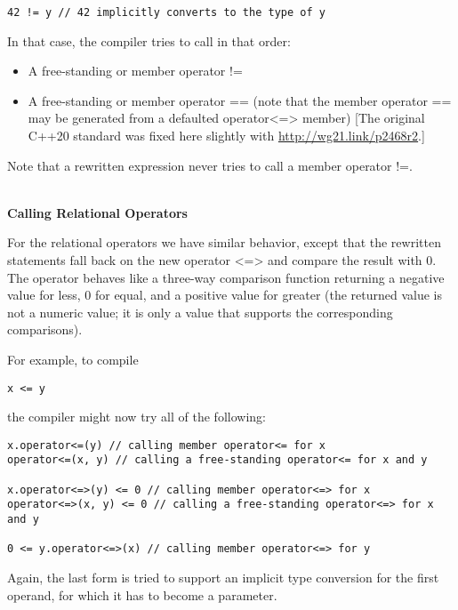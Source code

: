\begin{lstlisting}[style=styleCXX]
42 != y // 42 implicitly converts to the type of y
\end{lstlisting}

In that case, the compiler tries to call in that order:

\begin{itemize}
\item
A free-standing or member operator !=

\item
A free-standing or member operator == (note that the member operator == may be generated from a defaulted operator<=> member) [The original C++20 standard was fixed here slightly with \url{http://wg21.link/p2468r2}.]
\end{itemize}

Note that a rewritten expression never tries to call a member operator !=.

\noindent
\hspace*{\fill} \\ %
\textbf{Calling Relational Operators}

For the relational operators we have similar behavior, except that the rewritten statements fall back on the new operator <=> and compare the result with 0. The operator behaves like a three-way comparison function returning a negative value for less, 0 for equal, and a positive value for greater (the returned value is not a numeric value; it is only a value that supports the corresponding comparisons).

For example, to compile

\begin{lstlisting}[style=styleCXX]
x <= y
\end{lstlisting}

the compiler might now try all of the following:

\begin{lstlisting}[style=styleCXX]
x.operator<=(y) // calling member operator<= for x
operator<=(x, y) // calling a free-standing operator<= for x and y

x.operator<=>(y) <= 0 // calling member operator<=> for x
operator<=>(x, y) <= 0 // calling a free-standing operator<=> for x and y

0 <= y.operator<=>(x) // calling member operator<=> for y
\end{lstlisting}

Again, the last form is tried to support an implicit type conversion for the first operand, for which it has to become a parameter.






